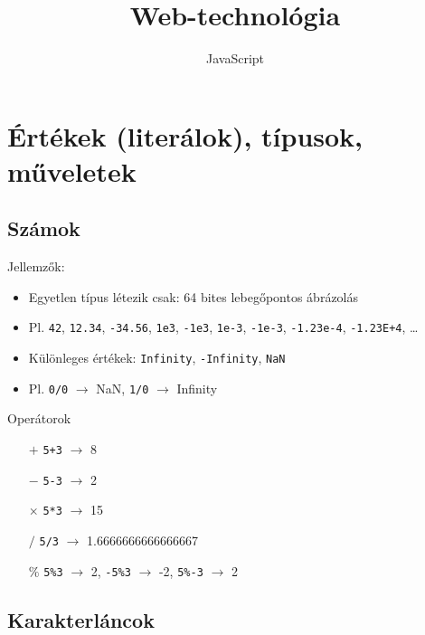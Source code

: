 \documentclass[usenames,dvipsnames,aspectratio=169]{beamer}
\title[Web technológiák - JavaScript]{Web-technológia}
\subtitle{JavaScript}
\begin{document}
\begin{frame}[plain]
  \titlepage
  \logoalul
\end{frame}

\section{Értékek (literálok), típusok, műveletek}

\subsection{Számok}

\begin{frame}
    Jellemzők:
    \begin{itemize}
        \item Egyetlen típus létezik csak: 64 bites lebegőpontos ábrázolás
        \item Pl. \texttt{42}, \texttt{12.34}, \texttt{-34.56}, \texttt{1e3}, \texttt{-1e3}, \texttt{1e-3}, \texttt{-1e-3}, \texttt{-1.23e-4}, \texttt{-1.23E+4}, \dots
        \item Különleges értékek: \texttt{Infinity}, \texttt{-Infinity}, \texttt{NaN}
        \item Pl. \texttt{0/0} $\to$ NaN, \texttt{1/0} $\to$ Infinity
    \end{itemize}
    \vfill
    Operátorok
    \begin{itemize}
        \item[$+$] \texttt{5+3} $\to$ 8
        \item[$-$] \texttt{5-3} $\to$ 2 
        \item[$\times$] \texttt{5*3} $\to$ 15
        \item[$/$] \texttt{5/3} $\to$ 1.6666666666666667
        \item[$\%$] \texttt{5\%3} $\to$ 2, \texttt{-5\%3} $\to$ -2, \texttt{5\%-3} $\to$ 2 
    \end{itemize}
\end{frame}

\subsection{Karakterláncok}
\end{document}
